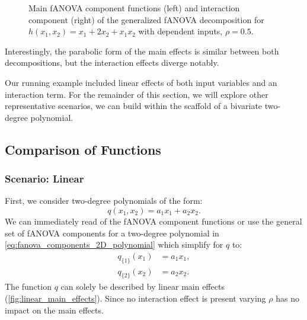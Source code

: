 \begin{figure}[htpb]
\begin{subfigure}[t]{0.49\textwidth}
    \end{subfigure}
    \caption{Main fANOVA component functions (left) and interaction component (right) of the generalized fANOVA decomposition for $h(x_1, x_2) = x_1 + 2 x_2 + x_1 x_2$ with dependent inputs, $\rho = 0.5$.}
    \label{fig:running_ex_dependent}
\end{figure}
Interestingly, the parabolic form of the main effects is similar between both decompositions, but the interaction effects diverge notably.\par
Our running example included linear effects of both input variables and an interaction term. For the remainder of this section, we will explore other representative scenarios, we can build within the scaffold of a bivariate two-degree polynomial.

\subsection{Comparison of Functions}
\subsubsection{Scenario: Linear}
First, we consider two-degree polynomials of the form:
$$q(x_1, x_2) = a_1 x_1 + a_2 x_2.$$
We can immediately read of the fANOVA component functions or use the general set of fANOVA components for a two-degree polynomial in \autoref{eq:fanova_components_2D_polynomial} which simplify for $q$ to:
\begin{align*}
    q_{\{1\}}(x_1) &= a_1 x_1, \\
    q_{\{2\}}(x_2) &= a_2 x_2.
\end{align*}
The function $q$ can solely be described by linear main effects (\autoref{fig:linear_main_effects}). Since no interaction effect is present varying $\rho$ has no impact on the main effects.

